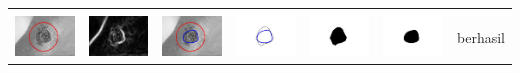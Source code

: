 \begin{table}[H]
\begin{tabular}{|m{0.7in}|m{0.7in}|m{0.7in}|m{0.7in}|m{0.7in}|m{0.7in}|m{0.7in}|}
		&  &  & & & &  \\
		\includegraphics[width=0.7in]{dataset/dataset_3/luka_hitam/ready/14_interp_init.jpg}&
		\includegraphics[width=0.7in]{dataset/dataset_3/luka_hitam/ready/14_interp_ext.jpg}&
		\includegraphics[width=0.7in]{dataset/dataset_3/luka_hitam/ready/14_interp_result.jpg}&
		\includegraphics[width=0.7in]{dataset/dataset_3/luka_hitam/ready/14_gt_r.jpg}&
		\includegraphics[width=0.7in]{dataset/dataset_3/luka_hitam/ready/14_r.jpg}&
		\includegraphics[width=0.7in]{dataset/dataset_3/luka_hitam/ready/14_interp_r.jpg}&
		berhasil\\
		\hline
		
	\end{tabular}
\end{table}

